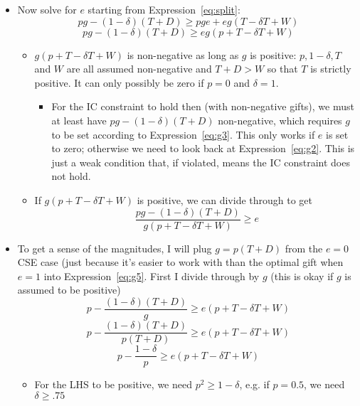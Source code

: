 \documentclass[12pt]{article}
\newcommand{\de}{\delta}
\begin{document}
\begin{itemize}
\begin{itemize}
				\item Now solve for $e$ starting from Expression~\ref{eq:split}:
					$$pg - \left(1 - \de \right) \left( T + D \right) \geq pge + eg \left( T - \de T + W \right)$$
					\begin{equation}
						pg - \left(1 - \de \right) \left( T + D \right) \geq eg \left( p + T - \de T + W \right)
						\label{eq:g5}
					\end{equation}
						\begin{itemize}
							\item {\color{red} $g \left( p + T - \de T + W \right)$ is non-negative as long as $g$ is positive}: $p, 1-\de, T$ and $W$ are all assumed non-negative and $T+D > W$ so that $T$ is strictly positive. It can only possibly be zero if $p=0$ and $\de = 1$.
								\begin{itemize}
									\item For the IC constraint to hold then (with non-negative gifts), we must at least have {\color{red} $pg - \left(1 - \de \right) \left( T + D \right)$ non-negative, which requires $g$ to be set according to Expression~\ref{eq:g3}}. This only works if $e$ is set to zero; otherwise we need to look back at Expression~\ref{eq:g2}. This is just a weak condition that, if violated, means the IC constraint does not hold.
								\end{itemize}
							\item If {\color{red} $g \left( p + T - \de T + W \right)$ is positive}, we can divide through to get
								$$\frac{pg - \left(1 - \de \right) \left( T + D \right)}{g \left( p + T - \de T + W \right)} \geq e$$
						\end{itemize}
					\item To get a sense of the magnitudes, I will plug $g = p \left(T+D\right)$ from the $e=0$ CSE case (just because it's easier to work with than the optimal gift when $e=1$ into Expression~\ref{eq:g5}. First I divide through by $g$ {\color{blue}(this is okay if $g$ is assumed to be positive)}
						\begin{equation}
							p - \frac{\left(1 - \de \right) \left( T + D \right)}{g} \geq e \left( p + T - \de T + W \right)
							\label{eq:g6}
						\end{equation}
						$$p - \frac{\left(1 - \de \right) \left( T + D \right)}{p \left(T+D\right)} \geq e \left( p + T - \de T + W \right)$$
						$$p - \frac{1 - \de}{p } \geq e \left( p + T - \de T + W \right)$$
							\begin{itemize}
								\item For the LHS to be positive, we need $p^2 \geq 1 - \de$, e.g. if $p = 0.5$, we need $\de \geq .75$

\end{itemize}
\end{itemize}
\end{itemize}
\end{document}
